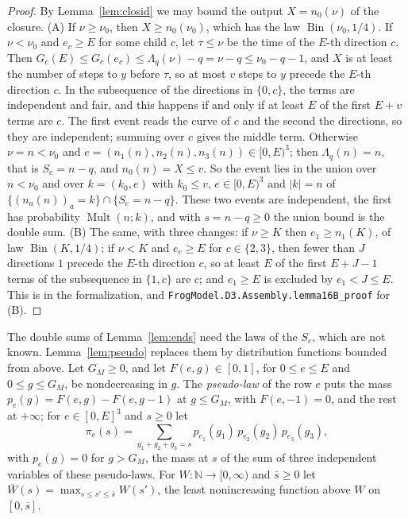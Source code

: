 \documentclass[11pt]{amsart}
\theoremstyle{definition}
\numberwithin{equation}{section}
\newcommand{\N}{\mathbb{N}}
\newcommand{\Bin}{\operatorname{Bin}}
\newcommand{\Mult}{\operatorname{Mult}}
\begin{document}
\begin{proof}
By Lemma~\ref{lem:closid} we may bound the output $X=n_0(\nu)$ of the closure. (A) If $\nu\ge \nu_0$, then $X\ge n_0(\nu_0)$, which has the law $\Bin(\nu_0,1/4)$. If $\nu<\nu_0$ and $e_c\ge E$ for some child $c$, let $\tau\le\nu$ be the time of the $E$-th direction $c$. Then $G_c(E)\le G_c(e_c)\le\Lambda_q(\nu)-q=\nu-q\le \nu_0-q-1$, and $X$ is at least the number of steps to $y$ before $\tau$, so at most $v$ steps to $y$ precede the $E$-th direction $c$. In the subsequence of the directions in $\{0,c\}$, the terms are independent and fair, and this happens if and only if at least $E$ of the first $E+v$ terms are $c$. The first event reads the curve of $c$ and the second the directions, so they are independent; summing over $c$ gives the middle term. Otherwise $\nu=n<\nu_0$ and $e=(n_1(n),n_2(n),n_3(n))\in[0,E)^3$; then $\Lambda_q(n)=n$, that is $S_e=n-q$, and $n_0(n)=X\le v$. So the event lies in the union over $n<\nu_0$ and over $k=(k_0,e)$ with $k_0\le v$, $e\in[0,E)^3$ and $|k|=n$ of $\{(n_a(n))_a=k\}\cap\{S_e=n-q\}$. These two events are independent, the first has probability $\Mult(n;k)$, and with $s=n-q\ge0$ the union bound is the double sum. (B) The same, with three changes: if $\nu\ge K$ then $e_1\ge n_1(K)$, of law $\Bin(K,1/4)$; if $\nu<K$ and $e_c\ge E$ for $c\in\{2,3\}$, then fewer than $J$ directions $1$ precede the $E$-th direction $c$, so at least $E$ of the first $E+J-1$ terms of the subsequence in $\{1,c\}$ are $c$; and $e_1\ge E$ is excluded by $e_1<J\le E$. This is  in the formalization, and \texttt{FrogModel.D3.Assembly.lemma16B\_proof} for (B).
\end{proof}

The double sums of Lemma~\ref{lem:ends} need the laws of the $S_e$, which are not known. Lemma~\ref{lem:pseudo} replaces them by distribution functions bounded from above. Let $G_M\ge0$, and let $F(e,g)\in[0,1]$, for $0\le e\le E$ and $0\le g\le G_M$, be nondecreasing in $g$. The \emph{pseudo-law} of the row $e$ puts the mass $p_e(g)=F(e,g)-F(e,g-1)$ at $g\le G_M$, with $F(e,-1)=0$, and the rest at $+\infty$; for $e\in[0,E]^3$ and $s\ge0$ let
\[
\pi_e(s)=\sum_{g_1+g_2+g_3=s}p_{e_1}(g_1)\,p_{e_2}(g_2)\,p_{e_3}(g_3),
\]
with $p_e(g)=0$ for $g>G_M$, the mass at $s$ of the sum of three independent variables of these pseudo-laws. For $W:\N\to[0,\infty)$ and $\bar s\ge0$ let $\overline W(s)=\max_{s\le s'\le \bar s}W(s')$, the least nonincreasing function above $W$ on $[0,\bar s]$.
\end{document}
